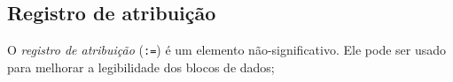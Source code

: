 \documentclass[11pt, brazil]{report}
\begin{document}
%
%
%

\subsection{Registro de atribuição}

O {\it registro de atribuição} ({\tt:=}) é um elemento não-significativo.
Ele pode ser usado para melhorar a legibilidade dos blocos de dados;
\end{document}
